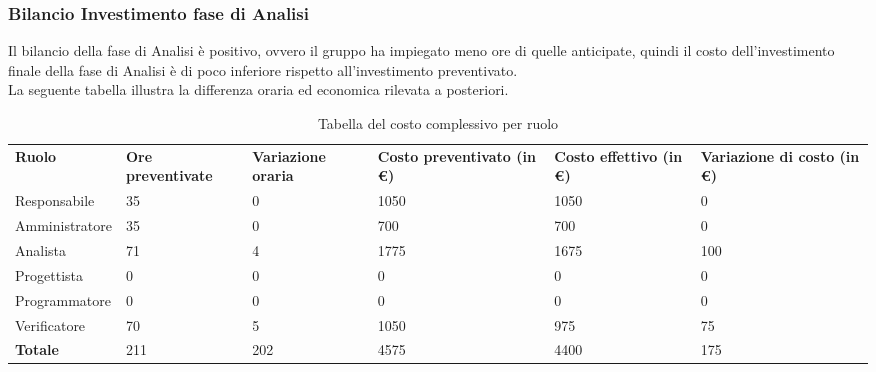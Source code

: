 \newpage
\subsubsection{Bilancio Investimento fase di Analisi}
Il bilancio della fase di Analisi è positivo, ovvero il gruppo ha impiegato meno ore di quelle anticipate, quindi il costo dell'investimento finale della fase di Analisi è di poco inferiore rispetto all'investimento preventivato.\\
La seguente tabella illustra la differenza oraria ed economica rilevata a posteriori.
{
\renewcommand{\arraystretch}{2}
\begin{longtable}[h]{ C{2.5cm} C{2.5cm} C{2.5cm} C{2.5cm} C{1.5cm} C{2.5cm}}
\caption{Tabella del costo complessivo per ruolo}\\
\rowcolor{\primaryColor}

\textcolor{\secondaryColor}{\textbf{Ruolo}} & 
\textcolor{\secondaryColor}{\textbf{Ore preventivate}} & 
\textcolor{\secondaryColor}{\textbf{Variazione oraria}} & 
\textcolor{\secondaryColor}{\textbf{Costo preventivato (in \euro{})}} & 
\textcolor{\secondaryColor}{\textbf{Costo effettivo (in \euro{})}} & 
\textcolor{\secondaryColor}{\textbf{Variazione di costo (in \euro{})}}\\	
	
Responsabile    &  35 & 0 & 1050 & 1050 &  0 \\
Amministratore  &  35 & 0 & 700 & 700 & 0 \\
Analista        & 71 & 4 & 1775 & 1675 & 100 \\
Progettista     &   0 &   0 &    0 &  0 & 0 \\
Programmatore   &   0 &   0 &    0 &  0 & 0 \\
Verificatore    &  70 &  5 & 1050 & 975 & 75 \\
\textbf{Totale} & 211 & 202 & 4575 & 4400 & 175 \\	

\end{longtable}
}

